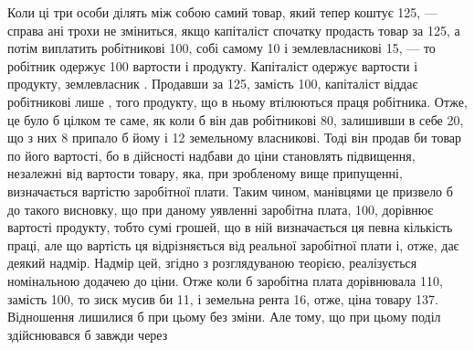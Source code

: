 Коли ці три особи ділять між собою самий товар, який тепер коштує
125, — справа ані трохи не зміниться, якщо капіталіст спочатку продасть
товар за 125, а потім виплатить робітникові 100, собі самому 10 і землевласникові
15, — то робітник одержує  \deq{} 100 вартости і продукту. Капіталіст
одержує  вартости і продукту, землевласник . Продавши за 125, замість
100, капіталіст віддає робітникові лише , того продукту, що в ньому втілюються
праця робітника. Отже, це було б цілком те саме, як коли б він дав
робітникові 80, залишивши в себе 20, що з них 8 припало б йому і 12 земельному
власникові. Тоді він продав би товар по його вартості, бо в дійсності
надбави до ціни становлять підвищення, незалежні від вартости товару, яка, при
зробленому вище припущенні, визначається вартістю заробітної плати. Таким
чином, манівцями це призвело б до такого висновку, що при даному уявленні
заробітна плата, 100, дорівнює вартості продукту, тобто \deq{} сумі грошей, що в
ній визначається ця певна кількість праці, але що вартість ця відрізняється від
реальної заробітної плати і, отже, дає деякий надмір. Надмір цей, згідно з розглядуваною
теорією, реалізується номінальною додачею до ціни. Отже коли б
заробітна плата дорівнювала 110, замість 100, то зиск мусив би \deq{} 11, і земельна
рента 16, отже, ціна товару \deq{} 137. Відношення лишилися б при
цьому без зміни. Але тому, що при цьому поділ здійснювався б завжди через
\parbreak{}  %
